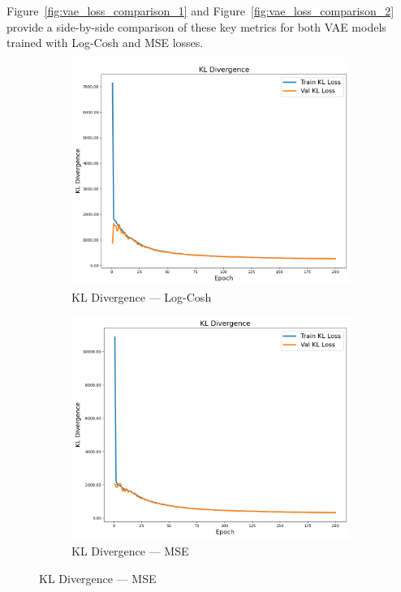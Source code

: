 Figure~\ref{fig:vae_loss_comparison_1} and Figure~\ref{fig:vae_loss_comparison_2} provide a side-by-side comparison of these key metrics for both VAE models trained with Log-Cosh and MSE losses.

\begin{figure}[p]
    \centering
    \begin{subfigure}[b]{0.48\textwidth}
        \includegraphics[width=\textwidth]{img/vae_results/200_epochs_128_ls_logcosh/logcosh_kl_loss.png}
        \caption{KL Divergence — Log-Cosh}
    \end{subfigure}
    \hfill
    \begin{subfigure}[b]{0.48\textwidth}
        \includegraphics[width=\textwidth]{img/vae_results/200_epochs_128_ls_mse/mse_kl_loss.png}
        \caption{KL Divergence — MSE}
    \end{subfigure}


\end{figure}
